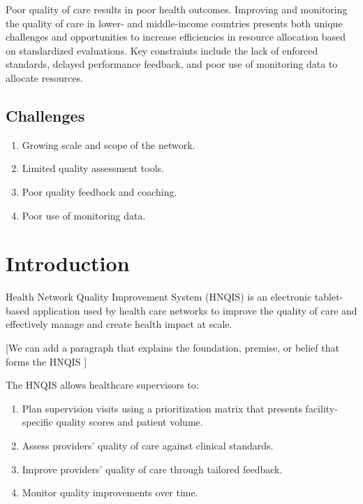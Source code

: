 \documentclass[]{book}
\providecommand{\tightlist}{%
  \setlength{\itemsep}{0pt}\setlength{\parskip}{0pt}}
\begin{document}
Poor quality of care results in poor health outcomes. Improving and monitoring the quality of care in lower- and middle-income countries presents both unique challenges and opportunities to increase efficiencies in resource allocation based on standardized evaluations. Key constraints include the lack of enforced standards, delayed performance feedback, and poor use of monitoring data to allocate resources.

\hypertarget{challenges}{%
\subsection{Challenges}\label{challenges}}

\begin{enumerate}
\def\labelenumi{\arabic{enumi}.}
\tightlist
\item
  Growing scale and scope of the network.
\item
  Limited quality assessment tools.
\item
  Poor quality feedback and coaching.
\item
  Poor use of monitoring data.
\end{enumerate}

\hypertarget{introduction-4}{%
\section{Introduction}\label{introduction-4}}

Health Network Quality Improvement System (HNQIS) is an electronic tablet-based application used by health care networks to improve the quality of care and effectively manage and create health impact at scale.

{[}We can add a paragraph that explains the foundation, premise, or belief that forms the HNQIS {]}

The HNQIS allows healthcare supervisors to:

\begin{enumerate}
\def\labelenumi{\arabic{enumi}.}
\tightlist
\item
  Plan supervision visits using a prioritization matrix that presents facility-specific quality scores and patient volume.
\item
  Assess providers' quality of care against clinical standards.
\item
  Improve providers' quality of care through tailored feedback.
\item
  Monitor quality improvements over time.
\end{enumerate}
\end{document}
